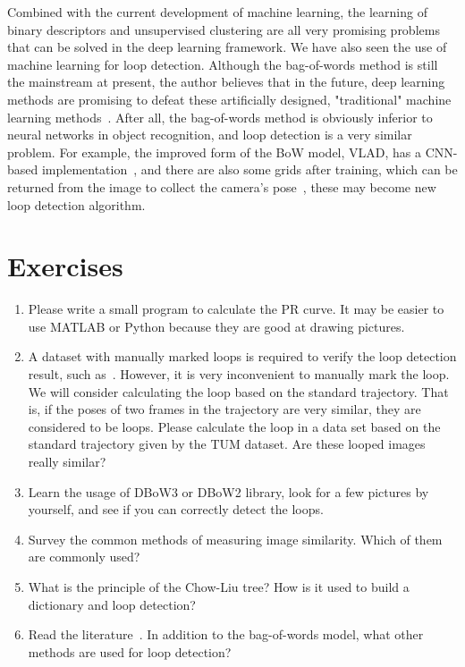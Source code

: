 Combined with the current development of machine learning, the learning of binary descriptors and unsupervised clustering are all very promising problems that can be solved in the deep learning framework. We have also seen the use of machine learning for loop detection. Although the bag-of-words method is still the mainstream at present, the author believes that in the future, deep learning methods are promising to defeat these artificially designed, "traditional" machine learning methods~\cite{Gao2015b, Hou2015a, Cascianelli2017}. After all, the bag-of-words method is obviously inferior to neural networks in object recognition, and loop detection is a very similar problem. For example, the improved form of the BoW model, VLAD, has a CNN-based implementation~\cite{Arandjelovic2016,AngelinaUy2018}, and there are also some grids after training, which can be returned from the image to collect the camera's pose~\cite{Kendall2015}, these may become new loop detection algorithm.

\section*{Exercises}
\begin{enumerate}
	\item Please write a small program to calculate the PR curve. It may be easier to use MATLAB or Python because they are good at drawing pictures.
	\item A dataset with manually marked loops is required to verify the loop detection result, such as~\cite{Cummins2008}. However, it is very inconvenient to manually mark the loop. We will consider calculating the loop based on the standard trajectory. That is, if the poses of two frames in the trajectory are very similar, they are considered to be loops. Please calculate the loop in a data set based on the standard trajectory given by the TUM dataset. Are these looped images really similar?
	\item Learn the usage of DBoW3 or DBoW2 library, look for a few pictures by yourself, and see if you can correctly detect the loops.
	\item Survey the common methods of measuring image similarity. Which of them are commonly used?
	\item What is the principle of the Chow-Liu tree? How is it used to build a dictionary and loop detection?
	\item Read the literature~\cite{Williams2009}. In addition to the bag-of-words model, what other methods are used for loop detection?
\end{enumerate}

